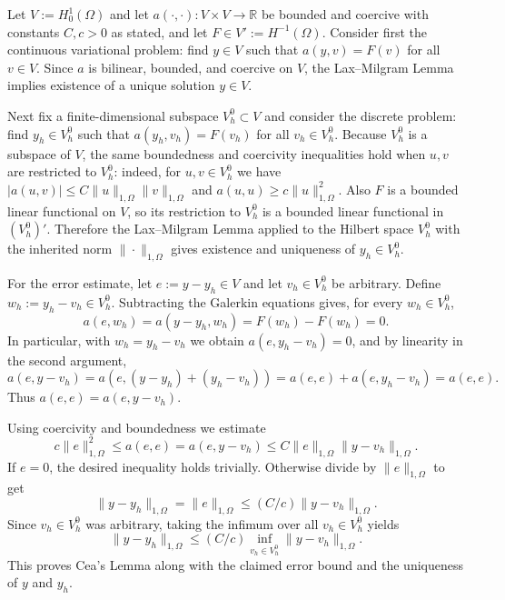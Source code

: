 \documentclass{article}
\begin{document}
Let $V := H_0^1(\Omega)$ and let $a(\cdot,\cdot) : V\times V\to\mathbb{R}$ be bounded and coercive with constants $C,c>0$ as stated, and let $F\in V' := H^{-1}(\Omega)$. Consider first the continuous variational problem: find $y\in V$ such that $a(y,v)=F(v)$ for all $v\in V$. Since $a$ is bilinear, bounded, and coercive on $V$, the Lax--Milgram Lemma implies existence of a unique solution $y\in V$.

Next fix a finite-dimensional subspace $V_h^0\subset V$ and consider the discrete problem: find $y_h\in V_h^0$ such that $a(y_h,v_h)=F(v_h)$ for all $v_h\in V_h^0$. Because $V_h^0$ is a subspace of $V$, the same boundedness and coercivity inequalities hold when $u,v$ are restricted to $V_h^0$: indeed, for $u,v\in V_h^0$ we have $|a(u,v)|\le C\|u\|_{1,\Omega}\|v\|_{1,\Omega}$ and $a(u,u)\ge c\|u\|_{1,\Omega}^2$. Also $F$ is a bounded linear functional on $V$, so its restriction to $V_h^0$ is a bounded linear functional in $(V_h^0)'$. Therefore the Lax--Milgram Lemma applied to the Hilbert space $V_h^0$ with the inherited norm $\|\cdot\|_{1,\Omega}$ gives existence and uniqueness of $y_h\in V_h^0$.

For the error estimate, let $e := y-y_h \in V$ and let $v_h\in V_h^0$ be arbitrary. Define $w_h := y_h-v_h \in V_h^0$. Subtracting the Galerkin equations gives, for every $w_h\in V_h^0$,
\[
a(e,w_h)=a(y-y_h,w_h)=F(w_h)-F(w_h)=0.
\]
In particular, with $w_h = y_h-v_h$ we obtain $a(e, y_h-v_h)=0$, and by linearity in the second argument,
\[
a(e,y-v_h)=a(e,(y-y_h)+(y_h-v_h))=a(e,e)+a(e, y_h-v_h)=a(e,e).
\]
Thus $a(e,e)=a(e,y-v_h)$.

Using coercivity and boundedness we estimate
\[
c\|e\|_{1,\Omega}^2 \le a(e,e) = a(e,y-v_h) \le C\|e\|_{1,\Omega}\|y-v_h\|_{1,\Omega}.
\]
If $e=0$, the desired inequality holds trivially. Otherwise divide by $\|e\|_{1,\Omega}$ to get
\[
\|y-y_h\|_{1,\Omega} = \|e\|_{1,\Omega} \le (C/c)\|y-v_h\|_{1,\Omega}.
\]
Since $v_h\in V_h^0$ was arbitrary, taking the infimum over all $v_h\in V_h^0$ yields
\[
\|y-y_h\|_{1,\Omega} \le (C/c) \inf_{v_h\in V_h^0} \|y-v_h\|_{1,\Omega}.
\]
This proves Cea's Lemma along with the claimed error bound and the uniqueness of $y$ and $y_h$.
\end{document}
